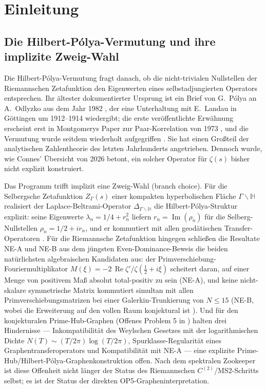 \documentclass[11pt]{article}
\theoremstyle{definition}
\theoremstyle{remark}
\renewcommand{\Re}{\operatorname{Re}}
\newcommand{\halfline}{\tfrac{1}{2}}
\newcommand{\zer}[1]{\zeta'/\zeta(#1)}
\begin{document}
\clearpage
\tableofcontents
\clearpage

\section{Einleitung}
\label{sec:intro}

\subsection{Die Hilbert-P\'olya-Vermutung und ihre implizite Zweig-Wahl}
\label{sec:hp-implicit-branch}

Die Hilbert-P\'olya-Vermutung fragt danach, ob die nicht-trivialen Nullstellen der
Riemannschen Zetafunktion den Eigenwerten eines selbstadjungierten Operators
entsprechen. Ihr ältester dokumentierter Ursprung ist ein Brief von G.~P\'olya
an A.~Odlyzko aus dem Jahr 1982 \cite{Polya1982letter}, der eine Unterhaltung
mit E.~Landau in Göttingen um 1912--1914 wiedergibt; die erste
veröffentlichte Erwähnung erscheint erst in Montgomerys Paper zur Paar-Korrelation
von 1973 \cite{Montgomery1973}, und die Vermutung wurde seitdem
wiederholt aufgegriffen \cite{Berry1985, BerryKeating1999, Connes1999}. Sie
hat einen Großteil der analytischen Zahlentheorie des letzten Jahrhunderts
angetrieben. Dennoch wurde, wie Connes' Übersicht von 2026 \cite{Connes2026}
betont, ein solcher Operator für $\zeta(s)$ bisher nicht explizit konstruiert.

Das Programm trifft implizit eine Zweig-Wahl (branch choice). Für die Selbergsche Zetafunktion
$Z_\Gamma(s)$ einer kompakten hyperbolischen Fläche
$\Gamma\backslash\mathbb{H}$ realisiert der Laplace-Beltrami-Operator
$\Delta_{\Gamma\backslash\mathbb{H}}$ die Hilbert-P\'olya-Struktur
explizit: seine Eigenwerte $\lambda_n = 1/4 + r_n^2$ liefern
$r_n = \operatorname{Im}(\rho_n)$ für die Selberg-Nullstellen $\rho_n = 1/2 + ir_n$,
und er kommutiert mit allen geodätischen Transfer-Operatoren
\cite{Selberg1956}. Für die Riemannsche Zetafunktion hingegen
schließen die Resultate NE-A und NE-B aus dem jüngsten Even-Dominance-Beweis
\cite{Geiger2026RHII} die beiden natürlichsten algebraischen Kandidaten aus:
der Primverschiebung-Fouriermultiplikator
$M(\xi) = -2\,\Re\zer{\halfline + i\xi}$ scheitert daran, auf einer Menge von positivem
Maß absolut total-positiv zu sein (NE-A), und keine nicht-skalare symmetrische Matrix
kommutiert simultan mit allen Primverschiebungsmatrizen bei einer
Galerkin-Trunkierung von $N\leq 15$ (NE-B, wobei die Erweiterung auf den vollen Raum konjektural
ist \cite{Geiger2026RHII}). Und für den konjekturalen Prime-Hub-Graphen (Offenes Problem 5 in
\cite{Geiger2026RHIII}) halten drei Hindernisse --- Inkompatibilität des Weylschen
Gesetzes mit der logarithmischen Dichte $N(T)\sim (T/2\pi)\log(T/2\pi)$, Spurklasse-Regularität
eines Graphentransferoperators und Kompatibilität mit NE-A --- eine explizite
Prime-Hub/Hilbert-P\'olya-Graphenkonstruktion offen. Nach dem spektralen Zookeeper \cite{Zookeeper2026}
ist diese Offenheit nicht länger der Status des Riemannschen $C^{(2)}$/MS2-Schritts
selbst; es ist der Status der direkten OP5-Grapheninterpretation.
\end{document}

